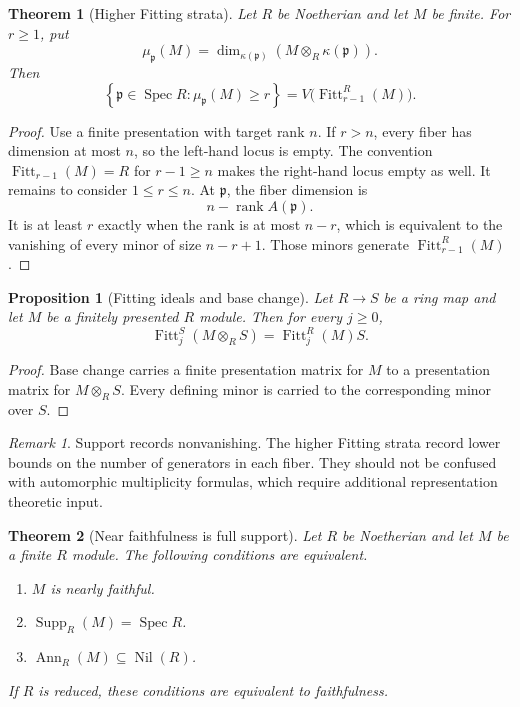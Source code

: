 \documentclass[11pt]{amsart}
\newtheorem{theorem}{Theorem}[section]
\newtheorem{proposition}[proposition]{Proposition}
\theoremstyle{definition}
\theoremstyle{remark}
\newtheorem{remark}[remark]{Remark}
\newcommand{\Spec}{\operatorname{Spec}}
\newcommand{\Supp}{\operatorname{Supp}}
\newcommand{\Ann}{\operatorname{Ann}}
\newcommand{\Fitt}{\operatorname{Fitt}}
\newcommand{\rank}{\operatorname{rank}}
\newcommand{\nil}{\operatorname{Nil}}
\newcommand{\frakp}{\mathfrak p}
\begin{document}
\begin{theorem}[Higher Fitting strata]\label{thm:higher_fitting_strata}
Let \(R\) be Noetherian and let \(M\) be finite. For \(r\geq1\), put
\[
\mu_{\frakp}(M)
=
\dim_{\kappa(\frakp)}
\left(M\otimes_R\kappa(\frakp)\right).
\]
Then
\[
\boxed{
\left\{
\frakp\in\Spec R:
\mu_{\frakp}(M)\geq r
\right\}
=
V\bigl(\Fitt_{r-1}^R(M)\bigr).
}
\]
\end{theorem}

\begin{proof}
Use a finite presentation with target rank \(n\). If \(r>n\), every fiber has dimension at most \(n\), so the left-hand locus is empty. The convention \(\Fitt_{r-1}(M)=R\) for \(r-1\geq n\) makes the right-hand locus empty as well. It remains to consider \(1\leq r\leq n\). At \(\frakp\), the fiber dimension is
\[
n-\rank A(\frakp).
\]
It is at least \(r\) exactly when the rank is at most \(n-r\), which is equivalent to the vanishing of every minor of size \(n-r+1\). Those minors generate \(\Fitt_{r-1}^R(M)\).
\end{proof}

\begin{proposition}[Fitting ideals and base change]\label{prop:fitting_base_change}
Let \(R\to S\) be a ring map and let \(M\) be a finitely presented \(R\) module. Then for every \(j\geq0\),
\[
\boxed{
\Fitt_j^S(M\otimes_RS)
=
\Fitt_j^R(M)S.
}
\]
\end{proposition}

\begin{proof}
Base change carries a finite presentation matrix for \(M\) to a presentation matrix for \(M\otimes_RS\). Every defining minor is carried to the corresponding minor over \(S\).
\end{proof}

\begin{remark}
Support records nonvanishing. The higher Fitting strata record lower bounds on the number of generators in each fiber. They should not be confused with automorphic multiplicity formulas, which require additional representation theoretic input.
\end{remark}

\begin{theorem}[Near faithfulness is full support]\label{thm:near_faithful_full_support}
Let \(R\) be Noetherian and let \(M\) be a finite \(R\) module. The following conditions are equivalent.
\begin{enumerate}
\item \(M\) is nearly faithful.
\item \(\Supp_R(M)=\Spec R\).
\item \(\Ann_R(M)\subseteq\nil(R)\).
\end{enumerate}
If \(R\) is reduced, these conditions are equivalent to faithfulness.
\end{theorem}
\end{document}
